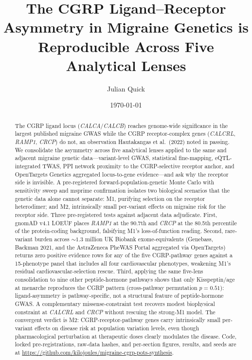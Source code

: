 \documentclass[11pt]{article}
\title{The CGRP Ligand--Receptor Asymmetry in Migraine Genetics is Reproducible Across Five Analytical Lenses}
\author{Julian Quick}
\date{\today}
\begin{document}
\maketitle

\begin{abstract}
The CGRP ligand locus (\textit{CALCA}/\textit{CALCB}) reaches genome-wide significance in the largest published migraine GWAS while the CGRP receptor-complex genes (\textit{CALCRL}, \textit{RAMP1}, \textit{CRCP}) do not, an observation Hautakangas et al.\ (2022) noted in passing. We consolidate the asymmetry across five analytical lenses applied to the same and adjacent migraine genetic data---variant-level GWAS, statistical fine-mapping, eQTL-integrated TWAS, PPI network proximity to the CGRP-selective receptor anchor, and OpenTargets Genetics aggregated locus-to-gene evidence---and ask why the receptor side is invisible. A pre-registered forward-population-genetic Monte Carlo with sensitivity sweep and msprime confirmation isolates two biological scenarios that the genetic data alone cannot separate: M1, purifying selection on the receptor heterodimer; and M2, intrinsically small per-variant effects on migraine risk for the receptor side. Three pre-registered tests against adjacent data adjudicate. First, gnomAD v4.1 LOEUF places \textit{RAMP1} at the 90.7th and \textit{CRCP} at the 80.5th percentile of the protein-coding background, falsifying M1's loss-of-function reading. Second, rare-variant burden across $\sim 1.3$ million UK Biobank exome-equivalents (Genebass, Backman 2021, and the AstraZeneca PheWAS Portal aggregated via OpenTargets) returns zero positive evidence rows for any of the five CGRP-pathway genes against a 15-phenotype panel that includes all four cardiovascular phenotypes, weakening M1's residual cardiovascular-selection rescue. Third, applying the same five-lens consolidation to nine other peptide-hormone pathways shows that only Kisspeptin/age at menarche reproduces the CGRP pattern (cross-pathway permutation $p = 0.51$): ligand-asymmetry is pathway-specific, not a structural feature of peptide-hormone GWAS. A complementary missense-constraint test recovers modest biophysical constraint at \textit{CALCRL} and \textit{CRCP} without rescuing the strong-M1 model. The convergent verdict is M2: CGRP-receptor-pathway genes carry intrinsically small per-variant effects on disease risk at population variation levels, even though pharmacological perturbation at therapeutic doses clearly modulates the disease. Code, locked pre-registrations, raw-data hashes, and per-section figures, results, and seeds are at \url{https://github.com/kilojoules/migraine-cgrp-pots-synthesis}.
\end{abstract}
\end{document}
